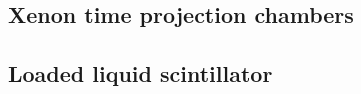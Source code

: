 \subsection{Xenon time projection chambers} 
\label{subsec:XeTPCs}


\subsection{Loaded liquid scintillator} 
\label{subsec:liquid_scint}



% 

% 

% 

%  

%  

% 

% 

% 

